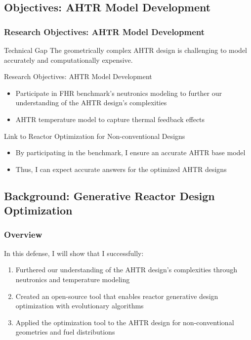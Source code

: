\subsection{Objectives: AHTR Model Development}
    \begin{frame}
        \frametitle{Research Objectives: AHTR Model Development}
        \begin{block}{Technical Gap}
            The geometrically complex AHTR design is challenging to model accurately 
            and computationally expensive. 
        \end{block}
        \pause
        \begin{block}{Research Objectives: AHTR Model Development}
        \begin{itemize}
            \item Participate in FHR benchmark's neutronics modeling to further our 
            understanding of the AHTR design's complexities
            \item AHTR temperature model to capture thermal feedback effects
        \end{itemize}
        \end{block}
        \pause
        \begin{block}{Link to Reactor Optimization for Non-conventional Designs}
        \begin{itemize}
        \item By participating in the benchmark, I ensure an accurate AHTR base model
        \item Thus, I can expect accurate answers for the optimized AHTR designs
        \end{itemize}
        \end{block}
    \end{frame}

\subsection{Background: Generative Reactor Design Optimization}
\begin{frame}
    \frametitle{Overview}
    In this defense, I will show that I successfully: 
    \begin{enumerate}
        \item Furthered our understanding of the \gls{AHTR} design's complexities 
        through neutronics and temperature modeling
        \item Created an open-source tool that enables reactor generative 
        design optimization with evolutionary algorithms
        \item Applied the optimization tool to the \gls{AHTR} design for 
        non-conventional geometries and fuel distributions 
    \end{enumerate}
\end{frame}

